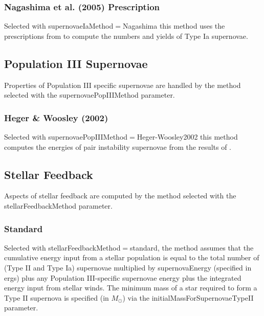 \subsubsection{Nagashima et al. (2005) Prescription}

Selected with {\normalfont \ttfamily supernovaeIaMethod}$=${\normalfont \ttfamily Nagashima} this method uses the prescriptions from \cite{nagashima_metal_2005} to compute the numbers and yields of Type Ia supernovae.

\subsection{Population III Supernovae}

Properties of Population III specific supernovae are handled by the method selected with the {\normalfont \ttfamily supernovaePopIIIMethod} parameter.

\subsubsection{Heger \& Woosley (2002)}

Selected with {\normalfont \ttfamily supernovaePopIIIMethod}$=${\normalfont \ttfamily Heger-Woosley2002} this method computes the energies of pair instability supernovae from the results of \cite{heger_nucleosynthetic_2002}.

\subsection{Stellar Feedback}

Aspects of stellar feedback are computed by the method selected with the {\normalfont \ttfamily stellarFeedbackMethod} parameter.

\subsubsection{Standard}

Selected with {\normalfont \ttfamily stellarFeedbackMethod}$=${\normalfont \ttfamily standard}, the method assumes that the cumulative energy input from a stellar population is equal to the total number of (Type II and Type Ia) supernovae multiplied by {\normalfont \ttfamily supernovaEnergy} (specified in ergs) plus any Population III-specific supernovae energy plus the integrated energy input from stellar winds. The minimum mass of a star required to form a Type II supernova is specified (in $M_\odot$) via the {\normalfont \ttfamily initialMassForSupernovaeTypeII} parameter.

